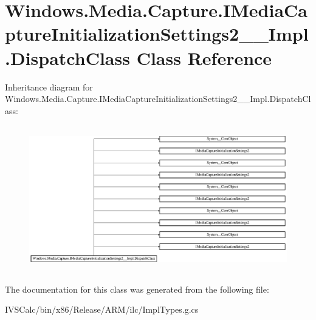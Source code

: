 \hypertarget{class_windows_1_1_media_1_1_capture_1_1_i_media_capture_initialization_settings2_____impl_1_1_dispatch_class}{}\section{Windows.\+Media.\+Capture.\+I\+Media\+Capture\+Initialization\+Settings2\+\_\+\+\_\+\+Impl.\+Dispatch\+Class Class Reference}
\label{class_windows_1_1_media_1_1_capture_1_1_i_media_capture_initialization_settings2_____impl_1_1_dispatch_class}
Inheritance diagram for Windows.\+Media.\+Capture.\+I\+Media\+Capture\+Initialization\+Settings2\+\_\+\+\_\+\+Impl.\+Dispatch\+Class\+:\begin{figure}[H]
\begin{center}
\leavevmode
\includegraphics[height=6.403327cm]{class_windows_1_1_media_1_1_capture_1_1_i_media_capture_initialization_settings2_____impl_1_1_dispatch_class}
\end{center}
\end{figure}


The documentation for this class was generated from the following file\+:\begin{DoxyCompactItemize}
\item 
I\+V\+S\+Calc/bin/x86/\+Release/\+A\+R\+M/ilc/Impl\+Types.\+g.\+cs\end{DoxyCompactItemize}
